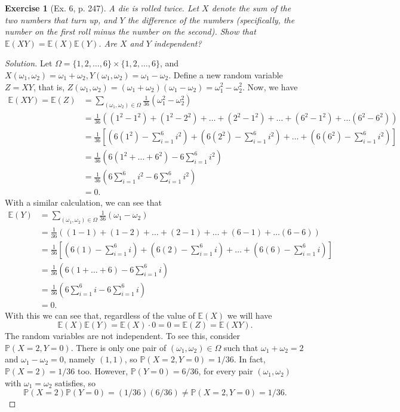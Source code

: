\documentclass[letterpaper, 10 pt, conference]{article}
\newtheorem{ex}{Exercise}
\newcommand\E{\ensuremath{\mathbb{E}}}
\renewcommand{\P}{\ensuremath{\mathbb{P}}}
\newcommand\Om{\ensuremath{\Omega}}
\newcommand{\w}{\ensuremath{\omega}}
\begin{document}
\begin{ex}[Ex. 6, p. 247]
	A die is rolled twice. Let $X$ denote the sum of the two numbers that turn up, and $Y$ the difference of the numbers (specifically, the number on the first roll minus the number on the second). Show that $\E(XY) = \E(X) \E(Y)$. Are $X$ and $Y$ independent?
\end{ex}
\begin{proof}[Solution]
	Let $\Om = \lbrace 1, 2, \dots, 6\rbrace \times  \lbrace 1, 2, \dots, 6\rbrace$, and $X(\w_1 , \w_2) = \w_1 + \w_2, Y(\w_1, \w_2) = \w_1 - \w_2$. Define a new random variable $Z = XY$, that is, $Z(\w_1, \w_2) = (\w_1 + \w_2)(\w_1 - \w_2) = \w_{1}^{2} - \w_{2}^{2}$. Now, we have
	\begin{align}
		\E(XY) = \E(Z) &= \sum_{(\w_1, \w_2) \in \Om} \frac{1}{36} (\w_{1}^{2} - \w_{2}^{2})\\
		&= \frac{1}{36} \left( (1^2 - 1^2) + (1^2 - 2^2) + \dots + (2^2 - 1^2) + \dots + (6^2 - 1^2) + \dots (6^2 - 6^2) \right)\\
		&= \frac{1}{36} \left\lbrack \left(6(1^2) - \sum_{i = 1}^{6} i^2\right) + \left(6(2^2) - \sum_{i= 1}^{6} i^2\right) + \dots + \left(6(6^2) - \sum_{i=1}^{6} i^2\right)\right\rbrack\\
		&= \frac{1}{36} \left( 6(1^2 + \dots + 6^2) -6 \sum_{i=1}^{6} i^2\right)\\
		&= \frac{1}{36} \left(6 \sum_{i=1}^{6} i^2 - 6 \sum_{i=1}^{6} i^2\right)\\
		&= 0.
	\end{align}
 With a similar calculation, we can see that
 	\begin{align}
	\E(Y) &= \sum_{(\w_1, \w_2) \in \Om} \frac{1}{36} (\w_{1} - \w_{2})\\
	 &= \frac{1}{36} \left( (1-1) + (1-2) + \dots + (2-1) + \dots + (6-1) + \dots (6-6) \right)\\
	 &= \frac{1}{36} \left\lbrack \left(6(1) - \sum_{i = 1}^{6} i\right) + \left(6(2) - \sum_{i= 1}^{6} i\right) + \dots + \left(6(6) - \sum_{i=1}^{6} i\right)\right\rbrack\\
	 &= \frac{1}{36} \left( 6(1 + \dots + 6) -6 \sum_{i=1}^{6} i\right)\\
	 &= \frac{1}{36} \left(6 \sum_{i=1}^{6} i - 6 \sum_{i=1}^{6} i\right)\\
	 &= 0.
 \end{align}
 With this we can see that, regardless of the value of $\E(X)$ we will have 
  \begin{equation}
  	\E(X) \E(Y) = \E(X) \cdot 0 = 0 = \E(Z) = \E(XY).
  \end{equation}
  The random variables are not independent. To see this, consider $\P(X = 2, Y = 0)$. There is only one pair of $(\w_1, \w_2) \in \Om$ such that $\w_1 + \w_2 = 2$ and $\w_1 - \w_2 = 0$, namely $(1,1)$, so $\P(X = 2, Y = 0) = 1/36$. In fact, $\P(X = 2) = 1/36$ too. However, $\P(Y = 0) = 6/36$, for every pair $(\w_1, \w_2)$ with $\w_1 = \w_2$ satisfies, so 
  \begin{equation}
  	\P(X = 2) \P(Y = 0) = (1/36)(6/36) \neq \P(X = 2, Y = 0) = 1/36.
  \end{equation}
\end{proof}
\end{document}
